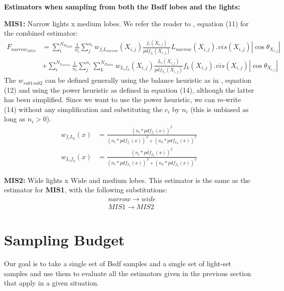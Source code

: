 \documentclass{article}
\begin{document}
\vspace{.5cm}
\textbf{Estimators when sampling from both the Bsdf lobes and the lights:}

\vspace{.2cm}
\textbf{MIS1:} Narrow lights x medium lobes. We refer the reader
to \cite{Veach:95}, equation (11) for the combined estimator:
\begin{align*}
F_{narrow_{MIS1}}
    &= \sum_{i}^{N_{B_{MIS1}}}  \frac{1}{n_i}  \sum_{j}^{n_i}
        w_{f_{i}L_{narrow}}(X_{i,j})
        \frac{  f_i(X_{i,j}) }  { pdf_{f_i}(X_{i,j}) }
        L_{narrow}(X_{i,j}) . vis(X_{i,j})  |\cos\theta_{X_{i,j}}|  \\
    &+ \sum_{i}^{N_{L_{narrow}}}  \frac{1}{n_i}  \sum_{j}^{n_i}  \sum_{k}^{N_{B_{MIS1}}}
        w_{L_i f_k}(X_{i,j})
        \frac{ L_i(X_{i,j}) }  { pdf_{L_i}(X_{i,j}) }
        f_k(X_{i,j}) . vis(X_{i,j})  |\cos\theta_{X_{i,j}}|
\end{align*}
The $w_{sub1 sub2}$ can be defined generally using the balance
heuristic as in \cite{Veach:95}, equation (12) and using the power
heuristic as defined in equation (14), although the latter has been
simplified. Since we want to use the power heuristic, we can
re-write (14) without any simplification and substituting the $c_i$
by $n_i$ (this is unbiased as long as $n_i > 0$).
\begin{align*}
w_{f_{i}L_k}(x)  &=  \frac{ {(n_i * pdf_{f_i}(x))}^\beta }
    { {(n_i * pdf_{f_i}(x))}^\beta + {(n_k * pdf_{L_k}(x))}^\beta } \\
w_{L_i f_k}(x)     &=  \frac{ {(n_i * pdf_{L_i}(x))}^\beta }
    { {(n_i * pdf_{L_i}(x))}^\beta + {(n_k * pdf_{f_k}(x))}^\beta }
\end{align*}


\vspace{.2cm}
\textbf{MIS2:} Wide lights x Wide and medium lobes. This estimator is the 
same as the estimator for \textbf{MIS1}, with the following substitutions:
\begin{align*}
 & narrow \rightarrow wide \\
 & MIS1 \rightarrow MIS2
\end{align*}



\section{Sampling Budget}\label{Budget}

Our goal is to take a single set of Bsdf samples and a single set of
light-set samples and use them to evaluate all the estimators
given in the previous section that apply in a given situation.
\end{document}
